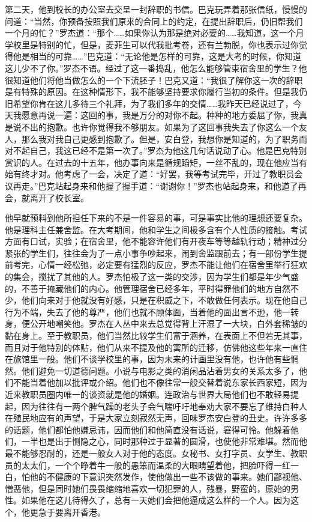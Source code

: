 \par 第二天，他到校长的办公室去交呈一封辞职的书信。巴克玩弄着那张信纸，慢慢的问道：“当然，你预备按照我们原来的合同上的约定，在提出辞职后，仍旧帮我们一个月的忙？”罗杰道：“那个……如果你认为那是绝对必要的……我知道，这一个月学校里是特别的忙，但是，麦菲生可以代我批考卷，还有兰勃脱，你也表示过你觉得他是相当的可靠……”巴克道：“无论他是怎样的可靠，这是大考的时候，你知道这儿少不了你。”罗杰不语。经过了这一番捣乱，他怎么能够管束宿舍里的学生？他很知道他们将他当做怎么的一个下流胚子！巴克又道：“我很了解你这一次的辞职是有特殊的原因。在这种情形下，我不能够坚持要求你履行当初的条件。但是我仍旧希望你肯在这儿多待三个礼拜，为了我们多年的交情……我昨天已经说过了，今天我愿意再说一遍：这回的事，我是万分的对你不起。种种的地方委屈了你，我真是说不出的抱歉。也许你觉得我不够朋友。如果为了这回事我失去了你这么一个友人，那么我对我自己更感到抱歉了。但是，安白登，我想你是知道的，为了职务而对不起自己，我这已经不是第一次了。”罗杰为他这几句话说动了心。他是巴克特别赏识的人。在过去的十五年，他办事向来是循规蹈矩，一丝不乱的，现在他应当有始有终才对。他考虑了一会，决定了道：“好罢，我等考试完毕，开过了教职员会议再走。”巴克站起身来和他握了握手道：“谢谢你！”罗杰也站起身来，和他道了再会，就离开了校长室。
\par 他早就预料到他所担任下来的不是一件容易的事，可是事实比他的理想还要复杂。他是理科主任兼舍监。在大考期间，他和学生之间极多含有个人性质的接触。考试方面有口试，实验；在宿舍里，他不能容许他们有开夜车等等越轨行动；精神过分紧张的学生们，往往会为了一点小事争吵起来，闹到舍监跟前去；有一部份学生提前考完，心情一经松弛，必定要有猛烈的反应，罗杰不能让他们在宿舍里举行狂欢的集会，搅扰了其他的人。罗杰怕极了这一类的交涉，因为学生们都是年少气盛的，不善于掩藏他们的内心。他管理宿舍已经多年，平时得罪他们的地方自然不少，他们向来对于他就没有好感，只是在积威之下，不敢做任何表示。现在他自己行为不端，失去了他的尊严，他们也就不顾体面，当着他的面出言不逊，他一转身，便公开地嘲笑他。罗杰在人丛中来去总觉得背上汗湿了一大块，白外套稀皱的黏在身上。至于教职员，他们当然比较学生们富于涵养，在表面上不但若无其事，而且对于他特别的体贴，他们从来不提及他的寓所的迁移，仿佛他这些年来一直住在旅馆里一般。他们不谈学校里的事，因为未来的计画里没有他，也许他有些惘然。他们避免一切道德问题。小说与电影之类的消闲品沾着男女的关系太多了，他们不能当着他加以批评或介绍。他们也不像往常一般交替着说东家长西家短，因为近来教职员圈内唯一的谈资就是他的婚姻。连政治与世界大局他们也不敢轻易提起，因为往往有一两个脾气躁的老头子会气喘吁吁地奉劝大家不要忘了维持白种人在殖民地应有的声望，于是大家立刻寂然无声，回味罗杰安白登的丑史。许许多多的话题，他们都怕他嫌忌讳，因而他们和他简直没有话说，窘得可怜。他躲着他们，一半也是出于恻隐之心，同时那种过于显著的圆滑，也使他非常难堪。然而他最不能够忍耐的，还是一般女人对于他的态度。女秘书、女打字员、女学生、教职员的太太们，一个个睁着牛一般的愚笨而温柔的大眼睛望着他，把脸吓得一红一白，怕他的不健康的下意识突然发作，使他做出一些不该做的事来。她们鄙视他、憎恶他，但是同时她们畏畏缩缩地喜欢一切犯罪的人，残暴，野蛮的，原始的男性。如果他在这儿待得久了，总有一天她们会把他逼成这么样的一个人。因为这个，他更急于要离开香港。
